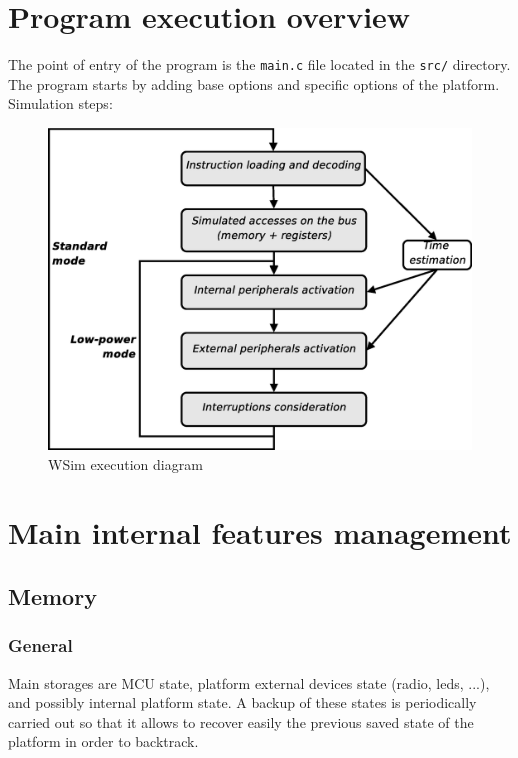 \documentclass[a4paper,10pt]{report}
\begin{document}
\chapter{Program execution overview}
\label{prog-exec}

The point of entry of the program is the \verb$main.c$ file located in the \verb$src/$ directory. The program starts by adding base options and specific options of the platform.
Simulation steps:

\begin{figure}[ht]
\begin{center}
 \includegraphics[scale=0.4]{figures/wsim_diag.eps}
\end{center}
\caption{WSim execution diagram}
\label{wsim diagram}
\end{figure}


\chapter{Main internal features management}

\section{Memory}
\subsection{General}
Main storages are MCU state, platform external devices state (radio, leds, ...), and possibly internal platform state. A backup of these states is periodically carried out so that it allows to recover easily the previous saved state of the platform in order to backtrack.
\end{document}
